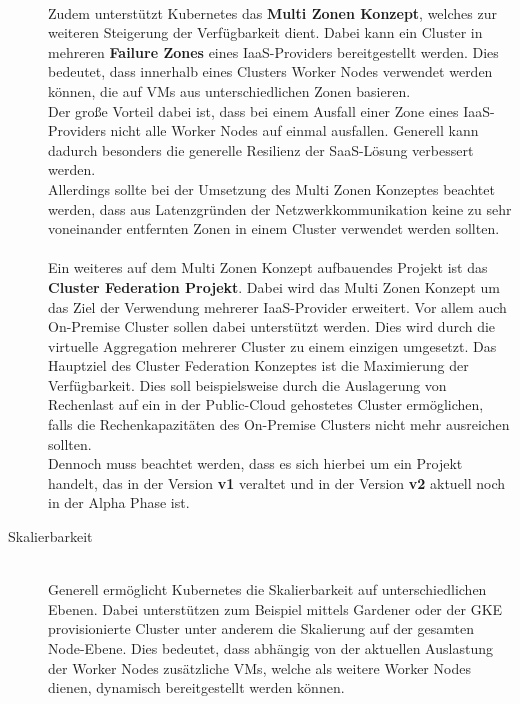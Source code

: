 \begin{description}
\\
Zudem unterstützt Kubernetes das \textbf{Multi Zonen Konzept}, welches zur weiteren Steigerung der Verfügbarkeit dient. Dabei kann ein Cluster in mehreren \textbf{Failure Zones} eines \ac{IaaS}-Providers bereitgestellt werden. Dies bedeutet, dass innerhalb eines Clusters Worker Nodes verwendet werden können, die auf \acsp{VM} aus unterschiedlichen Zonen basieren.\\ 
Der große Vorteil dabei ist, dass bei einem Ausfall einer Zone eines \ac{IaaS}-Providers nicht alle Worker Nodes auf einmal ausfallen. Generell kann dadurch besonders die generelle Resilienz der \ac{SaaS}-Lösung verbessert werden.\\
\newpage
Allerdings sollte bei der Umsetzung des Multi Zonen Konzeptes beachtet werden, dass aus Latenzgründen der Netzwerkkommunikation keine zu sehr voneinander entfernten Zonen in einem Cluster verwendet werden sollten.\autocite[Vgl][]{KubernetesAuthors.20190612}\\
\\
Ein weiteres auf dem Multi Zonen Konzept aufbauendes Projekt ist das \textbf{Cluster Federation Projekt}. Dabei wird das Multi Zonen Konzept um das Ziel der Verwendung mehrerer \ac{IaaS}-Provider erweitert. Vor allem auch On-Premise Cluster sollen dabei unterstützt werden. Dies wird durch die virtuelle Aggregation mehrerer Cluster zu einem einzigen umgesetzt. Das Hauptziel des Cluster Federation Konzeptes ist die Maximierung der Verfügbarkeit. Dies soll beispielsweise durch die Auslagerung von Rechenlast auf ein in der Public-Cloud gehostetes Cluster ermöglichen, falls die Rechenkapazitäten des On-Premise Clusters nicht mehr ausreichen sollten.\autocite[Vgl][]{KubernetesCommunity.20150820}\\
Dennoch muss beachtet werden, dass es sich hierbei um ein Projekt handelt, das in der Version \textbf{v1} veraltet\autocite[Vgl][]{KubernetesAuthors.20191021} und in der Version \textbf{v2} aktuell noch in der Alpha Phase ist.\autocite[Vgl][]{GitHubRepositoryKubernetesSIG.20190815}\\
\item[Skalierbarkeit] \hfill \\
Generell ermöglicht Kubernetes die Skalierbarkeit auf unterschiedlichen Ebenen. Dabei unterstützen zum Beispiel mittels Gardener oder der \ac{GKE} provisionierte Cluster unter anderem die Skalierung auf der gesamten Node-Ebene. Dies bedeutet, dass abhängig von der aktuellen Auslastung der Worker Nodes zusätzliche \acsp{VM}, welche als weitere Worker Nodes dienen, dynamisch bereitgestellt werden können.\autocite[Vgl][]{GitHubRepositoryGardener.20190401}\\

\end{description}
